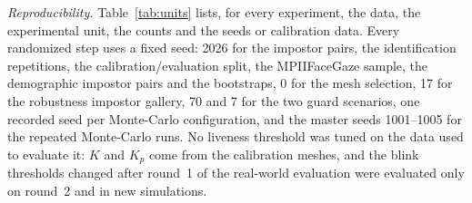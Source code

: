 \documentclass[journal]{IEEEtran}
\begin{document}
\emph{Reproducibility.} Table~\ref{tab:units} lists, for every experiment, the data, the experimental unit, the counts and the seeds or calibration data. Every randomized step uses a fixed seed: 2026 for the impostor pairs, the identification repetitions, the calibration/evaluation split, the MPIIFaceGaze sample, the demographic impostor pairs and the bootstraps, 0 for the mesh selection, 17 for the robustness impostor gallery, 70 and 7 for the two guard scenarios, one recorded seed per Monte-Carlo configuration, and the master seeds 1001--1005 for the repeated Monte-Carlo runs. No liveness threshold was tuned on the data used to evaluate it: $K$ and $K_p$ come from the calibration meshes, and the blink thresholds changed after round~1 of the real-world evaluation were evaluated only on round~2 and in new simulations.
\end{document}
